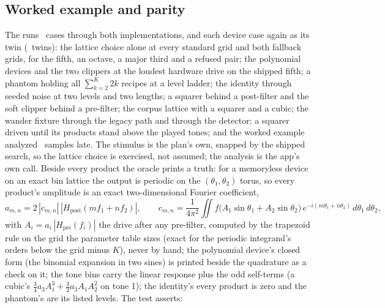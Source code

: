 \documentclass[11pt,a4paper]{article}
\begin{document}
\subsection{Worked example and parity}
\label{sec:imd-example}


The  runs \iparityCaseCount\ cases through both
implementations, and each device case again as its  twin
(\iparityTwinCount\ twins): the lattice choice alone at every standard
grid and both fallback grids, for the fifth, an octave, a major third and
a refused pair; the polynomial devices and the two clippers at the loudest
hardware drive on the shipped fifth; a phantom holding all
$\sum_{k=2}^{K} 2k$ recipes at a level ladder; the identity through seeded
noise at two levels and two lengths; a squarer behind a post-filter and
the soft clipper behind a pre-filter; the corpus lattice with a squarer
and a cubic; the wander fixture through the legacy path and through the
detector; a squarer driven until its products stand above the played
tones; and the worked example analyzed \iparityLatencySamples\ samples
late. The stimulus is the plan's own, snapped by the shipped search, so
the lattice choice is exercised, not assumed; the analysis is the app's
own call. Beside every product the oracle prints a truth: for a
memoryless device on an exact bin lattice the output is periodic on the
$(\theta_1, \theta_2)$ torus, so every product's amplitude is an exact
two-dimensional Fourier coefficient,
\begin{equation}
  a_{m,n} = 2\,|c_{m,n}|\,|H_{\mathrm{post}}(m f_1 + n f_2)|,\qquad
  c_{m,n} = \frac{1}{4\pi^2}\iint f\!\big(A_1\sin\theta_1 + A_2\sin\theta_2\big)\,e^{-i(m\theta_1 + n\theta_2)}\,d\theta_1\,d\theta_2,
  \label{eq:torus}
\end{equation}
with $A_i = a_i\,|H_{\mathrm{pre}}(f_i)|$ the drive after any pre-filter,
computed by the trapezoid rule on the grid the parameter table sizes
(exact for the periodic integrand's orders below the grid minus $K$),
never by hand; the polynomial device's closed form (the binomial expansion
in two sines) is printed beside the quadrature as a check on it; the tone
bins carry the linear response plus the odd self-terms (a cubic's
$\tfrac34 a_3 A_1^3 + \tfrac32 a_3 A_1 A_2^2$ on tone 1); the identity's
every product is zero and the phantom's are its listed levels.
\machineFloorNote{} The test asserts:
\end{document}
